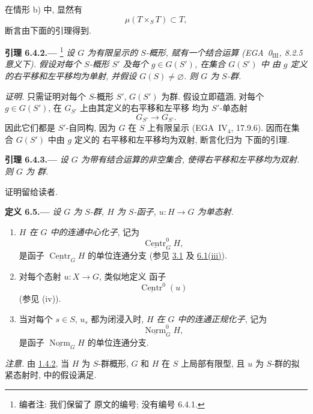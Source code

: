 在情形 \textup{b)} 中, 显然有
\[
  \mu(T\times_S T)\subset T,
\]
断言由下面的引理得到.

\medskip
{}\label{lem:sga3-VIB-6.4.2}%
\noindent\textbf{引理 6.4.2.---}%
\footnote{\label{note:sga3-VIB-60}编者注: 我们保留了
原文的编号; 没有编号 6.4.1.}
\emph{设 \(G\) 为有限呈示的 \(S\)-概形,
赋有一个结合运算 (EGA~0\(_{\mathrm{III}}\), 8.2.5
意义下). 假设对每个
\(S\)-概形 \(S'\) 及每个 \(g\in G(S')\), 在集合 \(G(S')\) 中
由 \(g\) 定义的右平移和左平移均为单射,
并假设 \(G(S)\ne\varnothing\). 则 \(G\) 为
\(S\)-群.}

\emph{证明.}
只需证明对每个 \(S\)-概形 \(S'\), \(G(S')\) 为群.
假设立即蕴涵, 对每个 \(g\in G(S')\),
在 \(G_{S'}\) 上由其定义的右平移和左平移
均为 \(S'\)-单态射
\[
  G_{S'}\longrightarrow G_{S'}.
\]
因此它们都是 \(S'\)-自同构, 因为 \(G\) 在
\(S\) 上有限呈示 (EGA~IV\(_4\), 17.9.6).
因而在集合 \(G(S')\) 中由 \(g\) 定义的
右平移和左平移均为双射, 断言化归为
下面的引理.

\medskip
{}\label{lem:sga3-VIB-6.4.3}%
\noindent\textbf{引理 6.4.3.---}
\emph{设 \(G\) 为带有结合运算的非空集合,
使得右平移和左平移均为双射. 则 \(G\) 为
群.}

证明留给读者.

\medskip
{}\label{def:sga3-VIB-6.5}%
\noindent\textbf{定义 6.5.---}
\emph{设 \(G\) 为 \(S\)-群, \(H\) 为
\(S\)-函子, \(u:H\to G\) 为单态射.}
\begin{enumerate}
\item[\textup{(i)}]
  \emph{\(H\) 在 \(G\) 中的连通中心化子}, 记为
  \[
    \underline{\operatorname{Centr}}^0_G H,
  \]
  是函子
  \(\underline{\operatorname{Centr}}_G H\) 的单位连通分支
  (参见 \hyperref[def:sga3-VIB-3.1]{3.1} 及
  \hyperref[def:sga3-VIB-6.1]{6.1\textup{(iii)}}).
\item[\textup{(i\(^{\prime}\))}]
  对每个态射 \(u:X\to G\), 类似地定义
  函子
  \[
    \underline{\operatorname{Centr}}^0(u)
  \]
  (参见 \textup{(iv)}).
\item[\SGAInlineRefTarget{def:sga3-VIB-6.5:item:ii}\textup{(ii)}]
  当对每个 \(s\in S\), \(u_s\) 都为闭浸入时,
  \emph{\(H\) 在 \(G\) 中的连通正规化子}, 记为
  \[
    \underline{\operatorname{Norm}}^0_G H,
  \]
  是函子
  \(\underline{\operatorname{Norm}}_G H\) 的单位连通分支.
\end{enumerate}

\noindent\emph{注意.}
由 \hyperref[cor:sga3-VIB-1.4.2]{1.4.2}, 当 \(H\) 为 \(S\)-群概形,
\(G\) 和 \(H\) 在 \(S\) 上局部有限型, 且
\(u\) 为 \(S\)-群的拟紧态射时,
\textup{} 中的假设满足.


